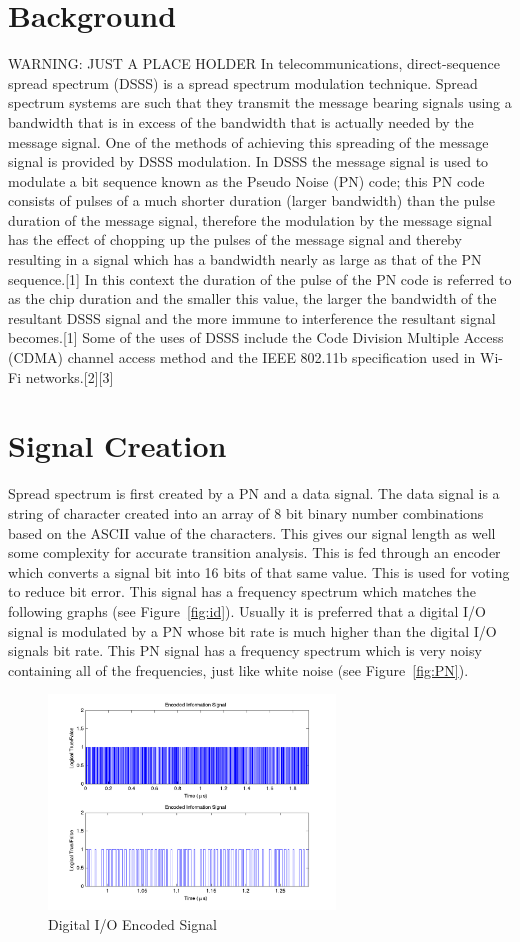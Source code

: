 \documentclass[journal]{IEEEtran}
\begin{document}
\section{Background}
WARNING: JUST A PLACE HOLDER
In telecommunications, direct-sequence spread spectrum (DSSS) is a spread spectrum modulation technique. Spread spectrum systems are such that they transmit the message bearing signals using a bandwidth that is in excess of the bandwidth that is actually needed by the message signal. One of the methods of achieving this spreading of the message signal is provided by DSSS modulation. In DSSS the message signal is used to modulate a bit sequence known as the Pseudo Noise (PN) code; this PN code consists of pulses of a much shorter duration (larger bandwidth) than the pulse duration of the message signal, therefore the modulation by the message signal has the effect of chopping up the pulses of the message signal and thereby resulting in a signal which has a bandwidth nearly as large as that of the PN sequence.[1] In this context the duration of the pulse of the PN code is referred to as the chip duration and the smaller this value, the larger the bandwidth of the resultant DSSS signal and the more immune to interference the resultant signal becomes.[1] Some of the uses of DSSS include the Code Division Multiple Access (CDMA) channel access method and the IEEE 802.11b specification used in Wi-Fi networks.[2][3]

\section{Signal Creation}
Spread spectrum is first created by a PN and a data signal. The data signal is a string of character created into an array of 8 bit binary number combinations based on the ASCII value of the characters. This gives our signal length as well some complexity for accurate transition analysis. This is fed through an encoder which converts a signal bit into 16 bits of that same value. This is used for voting to reduce bit error. This signal has a frequency spectrum which matches the following graphs (see Figure~\ref{fig:id}). Usually it is preferred that a digital I/O signal is modulated by a PN whose bit rate is much higher than the digital I/O signals bit rate. This PN signal has a frequency spectrum which is very noisy containing all of the frequencies, just like white noise (see Figure~\ref{fig:PN}).\\

\begin{figure}[h!]
\centering
\includegraphics[width=3in]{encoded_signal.png}
\caption{Digital I/O Encoded Signal}
\label{fig:dio}
\end{figure}
\end{document}
